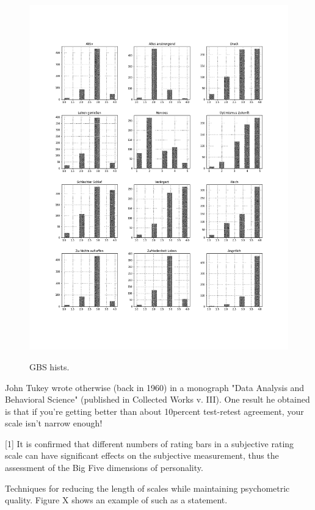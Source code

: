 \begin{figure}[ht]
	\begin{center}
		\includegraphics[scale=0.44,angle=0]{fig/gbs_hist}
		\label{std}
		\caption{GBS hists.}
	\end{center}
\end{figure}

John Tukey wrote otherwise (back in 1960) in a monograph "Data Analysis and Behavioral Science" (published in Collected Works v. III). One result he obtained is that if you're getting better than about 10percent test-retest agreement, your scale isn't narrow enough!

[1] It is confirmed that different numbers of rating bars in a subjective rating scale can have significant effects on the subjective measurement, thus the assessment of the Big Five dimensions of personality.

Techniques for reducing the length of scales while maintaining psychometric quality.
Figure X shows an example of such as a statement.


